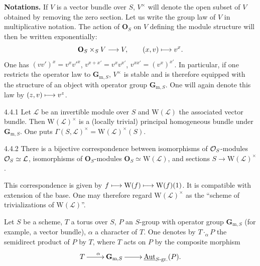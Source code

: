  \textbf{Notations.} If $V$ is a vector bundle over $S$, $V^\times$ will denote the open subset of $V$ obtained by removing the zero section. Let us write the group law of $V$ in multiplicative notation. The action of $\mathbf O_S$ on $V$ defining the module structure will then be written exponentially:
\[
\mathbf O_S\mathbin{\times_S}V\longrightarrow V,\qquad(x,v)\longmapsto v^x.
\]
One has $(vv')^x=v^xv'^x$, $v^{x+x'}=v^xv^{x'}$, $v^{xx'}=(v^x)^{x'}$. In particular, if one restricts the operator law to $\mathbf{G}_{\mathrm m,S}$, $V^\times$ is stable and is therefore equipped with the structure of an object with operator group $\mathbf{G}_{\mathrm m,S}$. One will again denote this law by $(z,v)\longmapsto v^z$.

\begin{definition}{4.4.1}\label{XIX.4.4.1}
{\renewcommand{\thefootnote}{(33)}}%
Let $\mathcal L$ be an invertible module over $S$ and $\mathrm W(\mathcal L)$ the associated vector bundle. Then $\mathrm W(\mathcal L)^\times$ is a (locally trivial) principal homogeneous bundle under $\mathbf{G}_{\mathrm m,S}$. One puts $\Gamma(S,\mathcal L)^\times=\mathrm W(\mathcal L)^\times(S)$.
\end{definition}
\begin{scholium}{4.4.2}\label{XIX.4.4.2}
There is a bijective correspondence between isomorphisms of $\mathcal{O}_S$-modules $\mathcal{O}_S\simeq\mathcal L$, isomorphisms of $\mathbf O_S$-modules $\mathbf O_S\simeq\mathrm W(\mathcal L)$,{\renewcommand{\thefootnote}{(34)}} and sections $S\to\mathrm W(\mathcal L)^\times$.
\end{scholium}
This correspondence is given by $f\longmapsto\mathrm W(f)\longmapsto\mathrm W(f)(1)$. It is compatible with extension of the base. One may therefore regard $\mathrm W(\mathcal L)^\times$ as the ``scheme of trivializations of $\mathrm W(\mathcal L)$''.

 Let $S$ be a scheme, $T$ a torus over $S$, $P$ an $S$-group with operator group $\mathbf{G}_{\mathrm m,S}$ (for example, a vector bundle), $\alpha$ a character of $T$. One denotes by $T\cdot_\alpha P$ the semidirect product of $P$ by $T$, where $T$ acts on $P$ by the composite morphism
\[
\xymatrix{T\ar[r]^\alpha&\mathbf{G}_{\mathrm m,S}\ar[r]&\underline{\Aut}_{S\text{-gr.}}(P).}
\]

